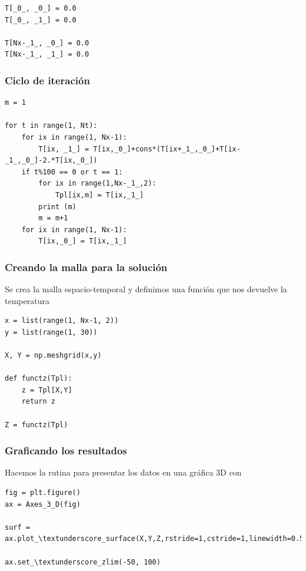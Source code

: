 {\begin{frame}
\begin{lstlisting}[caption=Se definen las condiciones iniciales y de frontera, style=FormattedNumber, basicstyle=\linespread{1.1}\ttfamily=\small, columns=fullflexible]
T[_0_, _0_] = 0.0
T[_0_, _1_] = 0.0

T[Nx-_1_, _0_] = 0.0
T[Nx-_1_, _1_] = 0.0
\end{lstlisting}
\end{frame}
\begin{frame}
\frametitle{Ciclo de iteración}
\begin{lstlisting}[caption=Ciclo de iteración para calcular los nuevos valores de temperatura, style=FormattedNumber, basicstyle=\linespread{1.1}\ttfamily=\small, columns=fullflexible]
m = 1

for t in range(1, Nt):
    for ix in range(1, Nx-1):
        T[ix, _1_] = T[ix,_0_]+cons*(T[ix+_1_,_0_]+T[ix-_1_,_0_]-2.*T[ix,_0_])
    if t%100 == 0 or t == 1:
        for ix in range(1,Nx-_1_,2):
            Tpl[ix,m] = T[ix,_1_]
        print (m)
        m = m+1
    for ix in range(1, Nx-1):
        T[ix,_0_] = T[ix,_1_]
\end{lstlisting}
\end{frame}
\begin{frame}
\frametitle{Creando la malla para la solución}
Se crea la malla espacio-temporal y definimos una función que nos devuelve la temperatura
\begin{lstlisting}[caption=Definición de la malla, style=FormattedNumber, basicstyle=\linespread{1.1}\ttfamily=\small, columns=fullflexible]
x = list(range(1, Nx-1, 2))
y = list(range(1, 30))

X, Y = np.meshgrid(x,y)

def functz(Tpl):
    z = Tpl[X,Y]
    return z
    
Z = functz(Tpl)
\end{lstlisting}
\end{frame}
\begin{frame}
\frametitle{Graficando los resultados}
Hacemos la rutina para presentar los datos en una gráfica 3D con 
\begin{lstlisting}[caption=Rutina para graficar los resultados, style=FormattedNumber, basicstyle=\linespread{1.1}\ttfamily=\small, columns=fullflexible]
fig = plt.figure()
ax = Axes_3_D(fig)

surf = ax.plot_\textunderscore_surface(X,Y,Z,rstride=1,cstride=1,linewidth=0.5,cmap=cm.hot_\textunderscore_r)

ax.set_\textunderscore_zlim(-50, 100)


\end{lstlisting}
\end{frame}}

